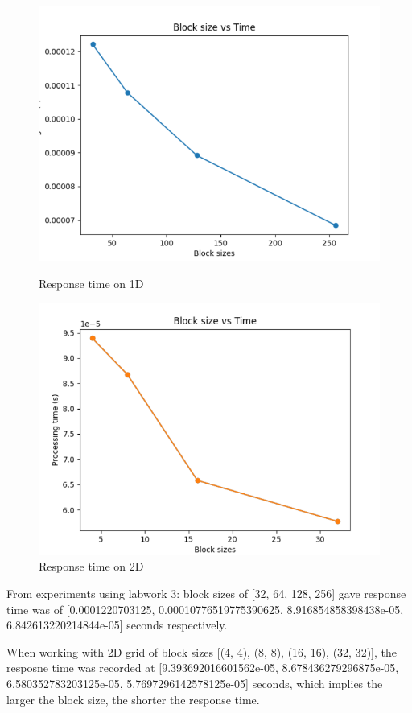 \documentclass{article}
\begin{document}
\begin{figure}[!htb]
    \begin{minipage}{0.48\textwidth}
        \centering
        \includegraphics[width=.7\linewidth]{GPU response time 1D.png}
        \caption{Response time on 1D}
        \label{fig:1D response time}
    \end{minipage}\hfill
    \begin{minipage}{0.48\textwidth}
        \centering
        \includegraphics[width=.7\linewidth]{GPU response time 2D.png}
        \caption{Response time on 2D}
        \label{fig:2D response time}
    \end{minipage}\hfill
\end{figure}

From experiments using labwork 3: block sizes of [32, 64, 128, 256] gave response time was of [0.0001220703125, 0.00010776519775390625, 8.916854858398438e-05, 6.842613220214844e-05] seconds respectively.

When working with 2D grid of block sizes [(4, 4), (8, 8), (16, 16), (32, 32)], the resposne time was recorded at [9.393692016601562e-05, 8.678436279296875e-05, 6.580352783203125e-05, 5.7697296142578125e-05] seconds, which implies the larger the block size, the shorter the response time.
\end{document}
